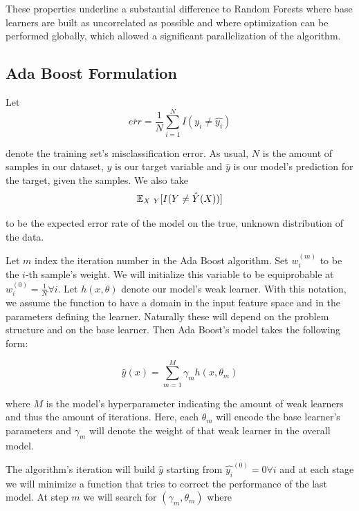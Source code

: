 These properties underline a substantial difference to Random Forests where base learners are built as uncorrelated as possible and where optimization can be performed globally, which allowed a significant parallelization of the algorithm.

\subsection{Ada Boost Formulation}

Let
\begin{equation} \label{equation-adaBoostTrainingError}
\overline{err} = \frac{1}{N} \sum_{i=1}^{N} I(y_i \neq \hat{y_i})
\end{equation}

denote the training set's misclassification error. As usual, $N$ is the amount of samples in our dataset, $y$ is our target variable and $\hat{y}$ is our model's prediction for the target, given the samples. We also take
\begin{equation}
\operatorname{\mathbb{E}}_{X \ Y} [ I(Y \neq \hat{Y}(X)) ]
\end{equation}

to be the expected error rate of the model on the true, unknown distribution of the data.

Let $m$ index the iteration number in the Ada Boost algorithm. Set $w^{(m)}_i$ to be the $i$-th sample's weight. We will initialize this variable to be equiprobable at $w^{(0)}_i = \frac{1}{N} \forall i$. Let $h(x,\theta)$ denote our model's weak learner. With this notation, we assume the function to have a domain in the input feature space and in the parameters defining the learner. Naturally these will depend on the problem structure and on the base learner. Then Ada Boost's model takes the following form:

\begin{equation} \label{equation-adaBoostModel}
\hat{y}(x) = \sum_{m=1}^{M} \gamma_m h(x,\theta_m)
\end{equation}

where $M$ is the model's hyperparameter indicating the amount of weak learners and thus the amount of iterations. Here, each $\theta_m$ will encode the base learner's parameters and $\gamma_m$ will denote the weight of that weak learner in the overall model.

The algorithm's iteration will build $\hat{y}$ starting from $\hat{y_i}^{(0)}= 0 \forall i$ and at each stage we will minimize a function that tries to correct the performance of the last model. At step $m$ we will search for $(\gamma_{m}, \theta_{m})$ where

